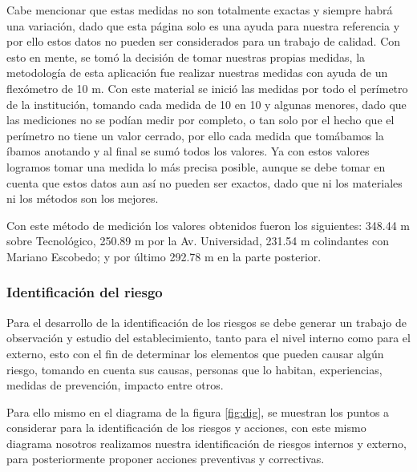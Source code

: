     Cabe mencionar que estas medidas no son totalmente exactas y siempre habrá una variación, dado que esta página solo es una ayuda para nuestra referencia y por ello estos datos no pueden ser considerados para un trabajo de calidad. Con esto en mente, se tomó la decisión de tomar nuestras propias medidas, la metodología de esta aplicación fue realizar nuestras medidas con ayuda de un flexómetro de 10 m. Con este material se inició las medidas por todo el perímetro de la institución, tomando cada medida de 10 en 10 y algunas menores, dado que las mediciones no se podían medir por completo, o tan solo por el hecho que el perímetro no tiene un valor cerrado, por ello cada medida que tomábamos la íbamos anotando y al final se sumó todos los valores. Ya con estos valores logramos tomar una medida lo más precisa posible, aunque se debe tomar en cuenta que estos datos aun así no pueden ser exactos, dado que ni los materiales ni los métodos son los mejores.
    
    Con este método de medición los valores obtenidos fueron los siguientes: 348.44 m sobre Tecnológico, 250.89 m por la Av. Universidad, 231.54 m  colindantes con Mariano Escobedo; y por último 292.78 m en la parte posterior.
    
    
    \subsubsection{Identificación del riesgo}
    
    
    Para el desarrollo de la identificación de los riesgos se debe generar un trabajo de observación y estudio del establecimiento, tanto para el nivel interno como para el externo, esto con el fin de determinar los elementos que pueden causar algún riesgo, tomando en cuenta sus causas, personas que lo habitan, experiencias, medidas de prevención, impacto entre otros.
    
    Para ello mismo en el diagrama de la figura \ref{fig:dig}, se muestran los puntos a considerar para la identificación de los riesgos y acciones, con este mismo diagrama nosotros realizamos nuestra identificación de riesgos internos y externo, para posteriormente proponer acciones preventivas y correctivas. 
    
